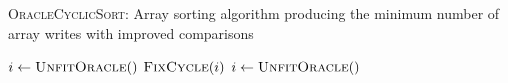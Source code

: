 \begin{algorithm}[H]
\caption{\textsc{OracleCyclicSort}: Array sorting algorithm producing the minimum number of array writes with improved comparisons}
\label{alg:ocs_algorithm}      
\begin{algorithmic}[1]
	\State $i \gets \textsc{UnfitOracle}()$
		\State $\textsc{FixCycle}(i)$
		\State $i \gets \textsc{UnfitOracle}()$
	\EndWhile
\EndProcedure
\end{algorithmic}
\end{algorithm}
